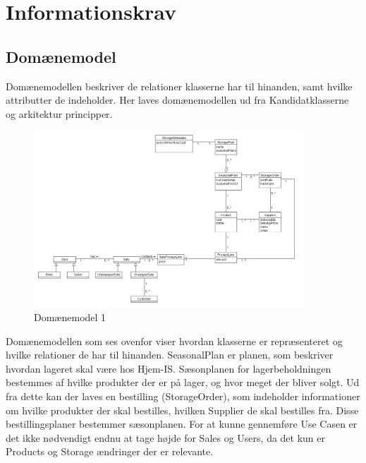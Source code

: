 \section{Informationskrav}\label{sec:informations-krav}

\subsection{Domænemodel}\label{Domainmodel}
Domænemodellen beskriver de relationer klasserne har til hinanden, samt hvilke attributter de indeholder. Her laves domænemodellen ud fra Kandidatklasserne og arkitektur principper.

\begin{figure}[H]
    \centering
    \includegraphics[width=0.9\textwidth]{figures/krav/domain_model_1.png}
    \caption{Domænemodel 1}
    \label{fig:domain_model}
\end{figure}

Domænemodellen som ses ovenfor viser hvordan klasserne er repræsenteret og hvilke relationer de har til hinanden. SeasonalPlan er planen, som beskriver hvordan lageret skal være hos Hjem-IS. Sæsonplanen for lagerbeholdningen bestemmes af hvilke produkter der er på lager, og hvor meget der bliver solgt. Ud fra dette kan der laves en bestilling (StorageOrder), som indeholder informationer om hvilke produkter der skal bestilles, hvilken Supplier de skal bestilles fra. Disse bestillingsplaner bestemmer sæsonplanen.
For at kunne gennemføre Use Casen er det ikke nødvendigt endnu at tage højde for Sales og Users, da det kun er Products og Storage ændringer der er relevante. 

